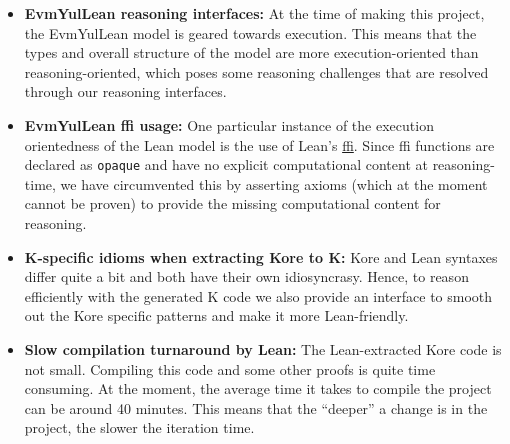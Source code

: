 \begin{itemize}
\item \textbf{EvmYulLean reasoning interfaces:} At the time of making this project, the EvmYulLean model is geared towards execution. This means that the types and overall structure of the model are more execution-oriented than reasoning-oriented, which poses some reasoning challenges that are resolved through our reasoning interfaces.
\item \textbf{EvmYulLean ffi usage:} One particular instance of the execution orientedness of the Lean model is the use of Lean's \href{https://en.wikipedia.org/wiki/Foreign_function_interface}{ffi}. Since ffi functions are declared as \texttt{opaque} and have no explicit computational content at reasoning-time, we have circumvented this by asserting axioms (which at the moment cannot be proven) to provide the missing computational content for reasoning.
\item \textbf{K-specific idioms when extracting Kore to K:} Kore and Lean syntaxes differ quite a bit and both have their own idiosyncrasy. Hence, to reason efficiently with the generated K code we also provide an interface to smooth out the Kore specific patterns and make it more Lean-friendly.
\item \textbf{Slow compilation turnaround by Lean:} The Lean-extracted Kore code is not small. Compiling this code and some other proofs is quite time consuming. At the moment, the average time it takes to compile the project can be around 40 minutes. This means that the ``deeper'' a change is in the project, the slower the iteration time.
\end{itemize}
